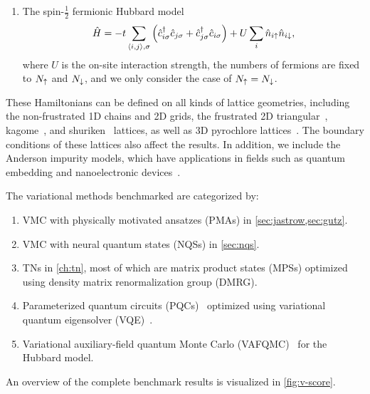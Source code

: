 \begin{enumerate}
\item The spin-$\frac{1}{2}$ fermionic Hubbard model
\begin{equation}
\hat{H} = -t \sum_{\langle i, j \rangle, \sigma} \left( \hat{c}^\dagger_{i \sigma} \hat{c}_{j \sigma} + \hat{c}^\dagger_{j \sigma} \hat{c}_{i \sigma} \right)
+ U \sum_i \hat{n}_{i {\uparrow}} \hat{n}_{i {\downarrow}},
\end{equation}
where $U$ is the on-site interaction strength, the numbers of fermions are fixed to $N_{\uparrow}$ and $N_{\downarrow}$, and we only consider the case of $N_{\uparrow} = N_{\downarrow}$.
\end{enumerate}
These Hamiltonians can be defined on all kinds of lattice geometries, including the non-frustrated 1D chains and 2D grids, the frustrated 2D triangular~\cite{li2015rare, liu2020intrinsic}, kagome~\cite{norman2016colloquium}, and shuriken~\cite{siddharthan2001square, astrakhantsev2021pinwheel} lattices, as well as 3D pyrochlore lattices~\cite{moessner1998properties, astrakhantsev2021broken}. The boundary conditions of these lattices also affect the results. In addition, we include the Anderson impurity models, which have applications in fields such as quantum embedding and nanoelectronic devices~\cite{anderson1961localized, kanamori1963electron, lu2019natural, cao2021tree, cao2024vision}.

The variational methods benchmarked are categorized by:
\begin{enumerate}
\item VMC with physically motivated ansatzes (PMAs) in \cref{sec:jastrow,sec:gutz}.
\item VMC with neural quantum states (NQSs) in \cref{sec:nqs}.
\item TNs in \cref{ch:tn}, most of which are matrix product states (MPSs) optimized using density matrix renormalization group (DMRG).
\item Parameterized quantum circuits (PQCs)~\cite{cerezo2021variational, wecker2015progress} optimized using variational quantum eigensolver (VQE)~\cite{peruzzo2014variational, seki2020symmetry, astrakhantsev2023phenomenological}.
\item Variational auxiliary-field quantum Monte Carlo (VAFQMC)~\cite{sorella2021phase} for the Hubbard model.
\end{enumerate}

An overview of the complete benchmark results is visualized in \cref{fig:v-score}.

\newpage

